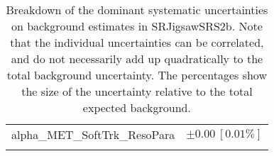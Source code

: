 \begin{table}
\begin{center}
\begin{tabular*}{\textwidth}{@{\extracolsep{\fill}}lc}
alpha\_MET\_SoftTrk\_ResoPara         & $\pm 0.00\ [0.01\%] $       \\
\noalign{\smallskip}\hline\noalign{\smallskip}
\end{tabular*}
\end{center}
\caption[Breakdown of uncertainty on background estimates]{
Breakdown of the dominant systematic uncertainties on background estimates in SRJigsawSRS2b.
Note that the individual uncertainties can be correlated, and do not necessarily add up quadratically to 
the total background uncertainty. The percentages show the size of the uncertainty relative to the total expected background.
\label{table.results.bkgestimate.uncertainties.SRJigsawSRS2b}}
\end{table}
%